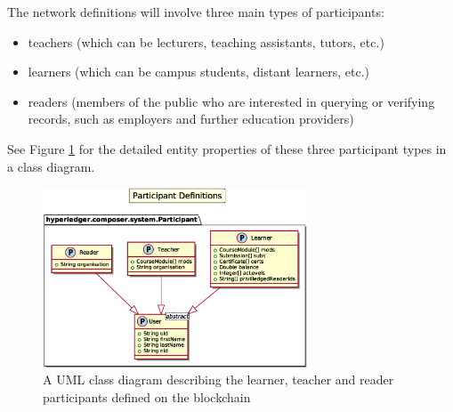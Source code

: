 The network definitions will involve three main types of participants: 
\begin{itemize}
    \setlength\itemsep{0em}    
    \item teachers (which can be lecturers, teaching assistants, tutors, etc.)
    \item learners (which can be campus students, distant learners, etc.)
    \item readers (members of the public who are interested in querying or verifying records, 
    such as employers and further education providers)
\end{itemize}

See Figure \ref{fig:participants} for the detailed entity properties of these three participant types 
in a class diagram.

\begin{figure}[!ht] 
    \centering    
    \includegraphics[width=0.7\textwidth]{participants}
    \caption[Participants Class Diagram]
        {A UML class diagram describing the learner, teacher and reader participants defined on the blockchain} 
    \label{fig:participants}
\end{figure}


